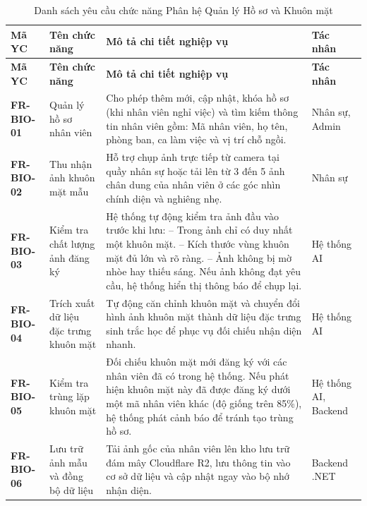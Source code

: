 \documentclass[12pt,a4paper]{article}
\begin{document}
\begin{longtable}{|C{\tabcolsep\relax}|L{\tabcolsep\relax}|L{\tabcolsep\relax}|C{\tabcolsep\relax}|}
\caption{Danh sách yêu cầu chức năng Phân hệ Quản lý Hồ sơ và Khuôn mặt}\\
\hline
{}
\textbf{Mã YC} & \textbf{Tên chức năng} & \textbf{Mô tả chi tiết nghiệp vụ} & \textbf{Tác nhân} \\
\hline
\endfirsthead
\hline
{}
\textbf{Mã YC} & \textbf{Tên chức năng} & \textbf{Mô tả chi tiết nghiệp vụ} & \textbf{Tác nhân} \\
\hline
\endhead
\textbf{FR-BIO-01} & Quản lý hồ sơ nhân viên & Cho phép thêm mới, cập nhật, khóa hồ sơ (khi nhân viên nghỉ việc) và tìm kiếm thông tin nhân viên gồm: Mã nhân viên, họ tên, phòng ban, ca làm việc và vị trí chỗ ngồi. & Nhân sự, Admin \\
\hline
{}
\textbf{FR-BIO-02} & Thu nhận ảnh khuôn mặt mẫu & Hỗ trợ chụp ảnh trực tiếp từ camera tại quầy nhân sự hoặc tải lên từ 3 đến 5 ảnh chân dung của nhân viên ở các góc nhìn chính diện và nghiêng nhẹ. & Nhân sự \\
\hline
\textbf{FR-BIO-03} & Kiểm tra chất lượng ảnh đăng ký & Hệ thống tự động kiểm tra ảnh đầu vào trước khi lưu:\newline
-- Trong ảnh chỉ có duy nhất một khuôn mặt.\newline
-- Kích thước vùng khuôn mặt đủ lớn và rõ ràng.\newline
-- Ảnh không bị mờ nhòe hay thiếu sáng. Nếu ảnh không đạt yêu cầu, hệ thống hiển thị thông báo để chụp lại. & Hệ thống AI \\
\hline
{}
\textbf{FR-BIO-04} & Trích xuất dữ liệu đặc trưng khuôn mặt & Tự động căn chỉnh khuôn mặt và chuyển đổi hình ảnh khuôn mặt thành dữ liệu đặc trưng sinh trắc học để phục vụ đối chiếu nhận diện nhanh. & Hệ thống AI \\
\hline
\textbf{FR-BIO-05} & Kiểm tra trùng lặp khuôn mặt & Đối chiếu khuôn mặt mới đăng ký với các nhân viên đã có trong hệ thống. Nếu phát hiện khuôn mặt này đã được đăng ký dưới một mã nhân viên khác (độ giống trên 85\%), hệ thống phát cảnh báo để tránh tạo trùng hồ sơ. & Hệ thống AI, Backend \\
\hline
{}
\textbf{FR-BIO-06} & Lưu trữ ảnh mẫu và đồng bộ dữ liệu & Tải ảnh gốc của nhân viên lên kho lưu trữ đám mây Cloudflare R2, lưu thông tin vào cơ sở dữ liệu và cập nhật ngay vào bộ nhớ nhận diện. & Backend .NET \\
\hline
\end{longtable}
\end{document}
